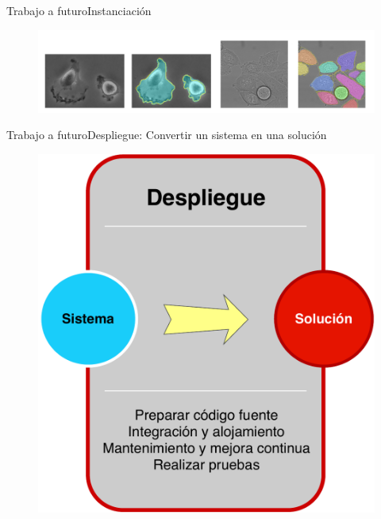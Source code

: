 \documentclass{beamer}
\begin{document}
    \begin{frame}{Trabajo a futuro}{Instanciación}
        \begin{figure}[]
            \centering
            \includegraphics[width=1\textwidth]{ejemplo}
        \end{figure}
    \end{frame}
    \begin{frame}{Trabajo a futuro}{Despliegue: Convertir un sistema en una solución}
        \begin{figure}[]
            \centering
            \includegraphics[height=0.95\textheight]{despliegue}
        \end{figure}
    \end{frame}
\end{document}
